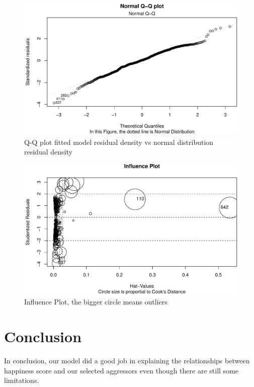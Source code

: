 \documentclass[11pt,a4paper,]{article}
\begin{document}
\begin{figure}
\centering
\includegraphics{Assignment4_files/figure-latex/qq-1.pdf}
\caption{\label{fig:qq}Q-Q plot fitted model residual density vs normal distribution residual density}
\end{figure}

\begin{figure}
\centering
\includegraphics{Assignment4_files/figure-latex/inf-1.pdf}
\caption{\label{fig:inf}Influence Plot, the bigger circle means outliers}
\end{figure}

\clearpage

\hypertarget{conclusion}{%
\section{Conclusion}\label{conclusion}}

In conclusion, our model did a good job in explaining the relationships between happiness score and our selected aggressors even though there are still some limitations.
\end{document}
